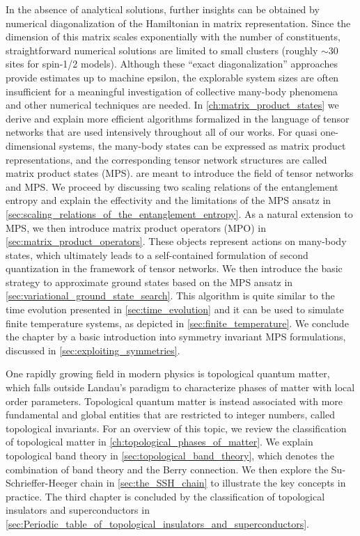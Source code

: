 In the absence of analytical solutions, further insights can be obtained by numerical diagonalization of the Hamiltonian in matrix representation.
Since the dimension of this matrix scales exponentially with the number of constituents, straightforward numerical solutions are limited to small clusters (roughly $\sim 30$ sites for spin-1/2 models).
Although these ``exact diagonalization'' approaches provide estimates up to machine epsilon, the explorable system sizes are often insufficient for a meaningful investigation of collective many-body phenomena and other numerical techniques are needed.
In \cref{ch:matrix_product_states} we derive and explain more efficient algorithms formalized in the language of tensor networks that are used intensively throughout all of our works.
For quasi one-dimensional systems, the many-body states can be expressed as matrix product representations, and the corresponding tensor network structures are called matrix product states (MPS).
 are meant to introduce the field of tensor networks and MPS.
We proceed by discussing two scaling relations of the entanglement entropy and explain the effectivity and the limitations of the MPS ansatz in \cref{sec:scaling_relations_of_the_entanglement_entropy}.
As a natural extension to MPS, we then introduce matrix product operators (MPO) in \cref{sec:matrix_product_operators}.
These objects represent actions on many-body states, which ultimately leads to a self-contained formulation of second quantization in the framework of tensor networks.
We then introduce the basic strategy to approximate ground states based on the MPS ansatz in \cref{sec:variational_ground_state_search}.
This algorithm is quite similar to the time evolution presented in \cref{sec:time_evolution} and it can be used to simulate finite temperature systems, as depicted in \cref{sec:finite_temperature}.
We conclude the chapter by a basic introduction into symmetry invariant MPS formulations, discussed in \cref{sec:exploiting_symmetries}.

One rapidly growing field in modern physics is topological quantum matter, which falls outside Landau's paradigm to characterize phases of matter with local order parameters.
Topological quantum matter is instead associated with more fundamental and global entities that are restricted to integer numbers, called topological invariants.
For an overview of this topic, we review the classification of topological matter in \cref{ch:topological_phases_of_matter}.
We explain topological band theory in \cref{sec:topological_band_theory}, which denotes the combination of band theory and the Berry connection.
We then explore the Su-Schrieffer-Heeger chain in \cref{sec:the_SSH_chain} to illustrate the key concepts in practice.
The third chapter is concluded by the classification of topological insulators and superconductors in \cref{sec:Periodic_table_of_topological_insulators_and_superconductors}.

